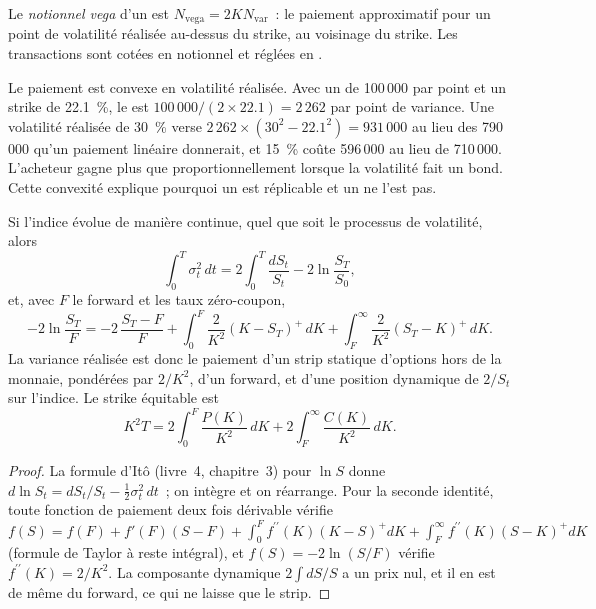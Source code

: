 \begin{definition}\label{def:dv:variance-swaps-and-volatility-derivatives:veganot}
Le \emph{notionnel vega} d'un  est $N_{\mathrm{vega}}=2KN_{\mathrm{var}}$~: le
paiement approximatif pour un point de volatilité réalisée au-dessus du strike, au voisinage du strike.
Les transactions sont cotées en notionnel  et réglées en .
\end{definition}

Le paiement est convexe en volatilité réalisée. Avec un  de 100\,000 par point et un strike de
22.1~\%, le  est $100\,000/(2\times22.1)=2\,262$ par point de variance. Une volatilité réalisée
de 30~\% verse $2\,262\times(30^2-22.1^2)=931\,000$ au lieu des 790\,000 qu'un paiement linéaire donnerait, et
15~\% coûte 596\,000 au lieu de 710\,000. L'acheteur gagne plus que proportionnellement lorsque la volatilité fait un bond.
Cette convexité explique pourquoi un  est réplicable et un  ne l'est pas.

\begin{proposition}[Réplication]\label{prop:dv:variance-swaps-and-volatility-derivatives:rep}
Si l'indice évolue de manière continue, quel que soit le processus de volatilité, alors
\[
\int_0^T\sigma_t^2\,dt=2\int_0^T\frac{dS_t}{S_t}-2\ln\frac{S_T}{S_0},
\]
et, avec $F$ le forward et les taux zéro-coupon,
\[
-2\ln\frac{S_T}{F}=-2\,\frac{S_T-F}F+\int_0^F\frac2{K^2}(K-S_T)^+\,dK+\int_F^\infty\frac2{K^2}(S_T-K)^+\,dK.
\]
La variance réalisée est donc le paiement d'un strip statique d'options hors de la monnaie, pondérées
par $2/K^2$, d'un forward, et d'une position dynamique de $2/S_t$ sur l'indice. Le strike équitable est
\[
K^2T=2\int_0^F\frac{P(K)}{K^2}\,dK+2\int_F^\infty\frac{C(K)}{K^2}\,dK.
\]
\end{proposition}
\begin{proof}
La formule d'Itô (livre~4, chapitre~3) pour $\ln S$ donne
$d\ln S_t=dS_t/S_t-\frac12\sigma_t^2\,dt$~; on intègre et on réarrange. Pour la seconde identité, toute fonction de paiement deux fois
dérivable vérifie
$f(S)=f(F)+f'(F)(S-F)+\int_0^Ff^{\prime\prime}(K)(K-S)^+dK+\int_F^\infty f^{\prime\prime}(K)(S-K)^+dK$ (formule de Taylor
à reste intégral), et $f(S)=-2\ln(S/F)$ vérifie $f^{\prime\prime}(K)=2/K^2$. La composante dynamique $2\int dS/S$ a un prix nul, et il en est de même
du forward, ce qui ne laisse que le strip.
\end{proof}


